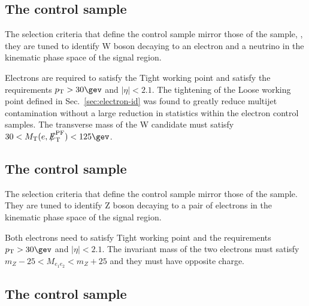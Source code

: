 \subsection{The \texorpdfstring{\ej}{electron plus jets} control sample}
\label{subsec:elecontrolSelection}

The selection criteria that define the \ej control sample
mirror those of the \mj sample, \ie, they are tuned
to identify W boson decaying to an electron and a neutrino in the
kinematic phase space of the signal region.

Electrons are required to satisfy the Tight working point and satisfy
the requirements $\Pt> 30\gev$ and $|\eta| < 2.1$. The tightening of
the Loose working point defined in Sec.~\ref{sec:electron-id} was
found to greatly reduce multijet contamination without a large
reduction in statistics within the electron control samples. The
transverse mass of the W candidate must satisfy $30 < \mt(e,\pfmet)
< 125\gev$.

\subsection{The \texorpdfstring{\eej}{electron plus jets} control sample}
\label{subsec:dielecontrolSelection}

The selection criteria that define the \eej control sample
mirror those of the \mmj sample. They are tuned
to identify Z boson decaying to a pair of electrons in the
kinematic phase space of the signal region.

Both electrons need to satisfy Tight working point and the
requirements $\Pt> 30\gev$ and $|\eta| < 2.1$. The invariant mass of
the two electrons must satisfy $m_{Z} - 25 < M_{e_1e_2} < m_{Z} + 25$
and they must have opposite charge.

\subsection{The \texorpdfstring{\gj}{photon plus jets} control sample}
\label{subsec:photoncontrolSelection}


